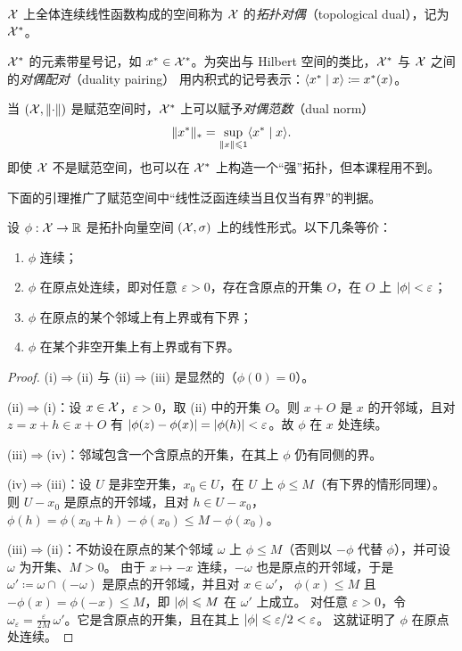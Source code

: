 \begin{definition}[对偶空间]
\label{def:36}
$\mathcal{X}$ 上全体连续线性函数构成的空间称为 $\mathcal{X}$ 的\emph{拓扑对偶}（topological dual），记为 $\mathcal{X}^{*}$。
\end{definition}

$\mathcal{X}^{*}$ 的元素带星号记，如 $x^*\in\mathcal{X}^{*}$。为突出与 Hilbert 空间的类比，$\mathcal{X}^{*}$ 与 $\mathcal{X}$ 之间的\emph{对偶配对}（duality pairing）
用内积式的记号表示：$\langle x^* \mid x\rangle\coloneqq x^*(x)$。

\begin{remark}
\label{rem:25}
当 $(\mathcal{X},\lVert \cdot\rVert)$ 是赋范空间时，$\mathcal{X}^{*}$ 上可以赋予\emph{对偶范数}（dual norm）
\[
  \lVert x^*\rVert_*=\sup_{\lVert x\rVert\leqslant1}\langle x^* \mid x\rangle.
\]
即使 $\mathcal{X}$ 不是赋范空间，也可以在 $\mathcal{X}^{*}$ 上构造一个“强”拓扑，但本课程用不到。
\end{remark}

下面的引理推广了赋范空间中“线性泛函连续当且仅当有界”的判据。

\begin{lemma}[连续线性形式的刻画]
\label{res:70}
设 $\phi:\mathcal{X}\to\mathbb{R}$ 是拓扑向量空间 $(\mathcal{X},\sigma)$ 上的线性形式。以下几条等价：
\begin{enumerate}[label=(\roman*)]
  \item $\phi$ 连续；
  \item $\phi$ 在原点处连续，即对任意 $\varepsilon>0$，存在含原点的开集 $O$，在 $O$ 上 $\lvert \phi\rvert<\varepsilon$；
  \item $\phi$ 在原点的某个邻域上有上界或有下界；
  \item $\phi$ 在某个非空开集上有上界或有下界。
\end{enumerate}
\end{lemma}

\begin{proof}
(i)$\Rightarrow$(ii) 与 (ii)$\Rightarrow$(iii) 是显然的（$\phi(0)=0$）。

(ii)$\Rightarrow$(i)：设 $x\in\mathcal{X}$，$\varepsilon>0$，取 (ii) 中的开集 $O$。则 $x+O$ 是 $x$ 的开邻域，且对 $z=x+h\in x+O$ 有
$\lvert \phi(z)-\phi(x)\rvert=\lvert \phi(h)\rvert<\varepsilon$。故 $\phi$ 在 $x$ 处连续。

(iii)$\Rightarrow$(iv)：邻域包含一个含原点的开集，在其上 $\phi$ 仍有同侧的界。

(iv)$\Rightarrow$(iii)：设 $U$ 是非空开集，$x_0\in U$，在 $U$ 上 $\phi\leqslant M$（有下界的情形同理）。
则 $U-x_0$ 是原点的开邻域，且对 $h\in U-x_0$，$\phi(h)=\phi(x_0+h)-\phi(x_0)\leqslant M-\phi(x_0)$。

(iii)$\Rightarrow$(ii)：不妨设在原点的某个邻域 $\omega$ 上 $\phi\leqslant M$（否则以 $-\phi$ 代替 $\phi$），并可设 $\omega$ 为开集、$M>0$。
由于 $x\mapsto-x$ 连续，$-\omega$ 也是原点的开邻域，于是 $\omega'\coloneqq\omega\cap(-\omega)$ 是原点的开邻域，并且对 $x\in\omega'$，
$\phi(x)\leqslant M$ 且 $-\phi(x)=\phi(-x)\leqslant M$，即 $\lvert \phi\rvert\leqslant M$ 在 $\omega'$ 上成立。
对任意 $\varepsilon>0$，令 $\omega_\varepsilon=\frac{\varepsilon}{2M}\,\omega'$。它是含原点的开集，且在其上 $\lvert \phi\rvert\leqslant\varepsilon/2<\varepsilon$。
这就证明了 $\phi$ 在原点处连续。
\end{proof}

